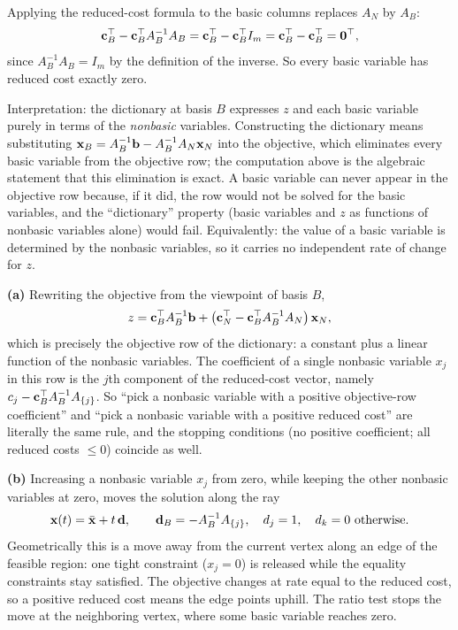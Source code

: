
Applying the reduced-cost formula to the basic columns replaces $A_N$ by
$A_B$:
\[
\mathbf{c}_B^\top - \mathbf{c}_B^\top A_B^{-1} A_B
= \mathbf{c}_B^\top - \mathbf{c}_B^\top I_m
= \mathbf{c}_B^\top - \mathbf{c}_B^\top = \mathbf{0}^\top,
\]
since $A_B^{-1}A_B = I_m$ by the definition of the inverse. So every
basic variable has reduced cost exactly zero.

Interpretation: the dictionary at basis $B$ expresses $z$ and each basic
variable purely in terms of the \emph{nonbasic} variables. Constructing
the dictionary means substituting
$\mathbf{x}_B = A_B^{-1}\mathbf{b} - A_B^{-1}A_N\mathbf{x}_N$ into the objective, which
eliminates every basic variable from the objective row; the computation
above is the algebraic statement that this elimination is exact. A basic
variable can never appear in the objective row because, if it did, the
row would not be solved for the basic variables, and the ``dictionary''
property (basic variables and $z$ as functions of nonbasic variables
alone) would fail. Equivalently: the value of a basic variable is
determined by the nonbasic variables, so it carries no independent rate
of change for $z$.


\textbf{(a)} Rewriting the objective from the viewpoint of basis $B$,
\[
z = \mathbf{c}_B^\top A_B^{-1}\mathbf{b}
+ \left(\mathbf{c}_N^\top - \mathbf{c}_B^\top A_B^{-1} A_N\right)\mathbf{x}_N,
\]
which is precisely the objective row of the dictionary: a constant plus a
linear function of the nonbasic variables. The coefficient of a single
nonbasic variable $x_j$ in this row is the $j$th component of the
reduced-cost vector, namely $c_j - \mathbf{c}_B^\top A_B^{-1} A_{\{j\}}$. So
``pick a nonbasic variable with a positive objective-row coefficient''
and ``pick a nonbasic variable with a positive reduced cost'' are
literally the same rule, and the stopping conditions (no positive
coefficient; all reduced costs $\leq 0$) coincide as well.

\textbf{(b)} Increasing a nonbasic variable $x_j$ from zero, while
keeping the other nonbasic variables at zero, moves the solution along
the ray
\[
\mathbf{x}(t) = \bar{\mathbf{x}} + t\,\mathbf{d},
\qquad
\mathbf{d}_B = -A_B^{-1}A_{\{j\}},\quad d_j = 1,\quad d_k = 0
\text{ otherwise}.
\]
Geometrically this is a move away from the current vertex along an edge
of the feasible region: one tight constraint ($x_j = 0$) is released
while the equality constraints stay satisfied. The objective changes at
rate equal to the reduced cost, so a positive reduced cost means the edge
points uphill. The ratio test stops the move at the neighboring vertex,
where some basic variable reaches zero.

